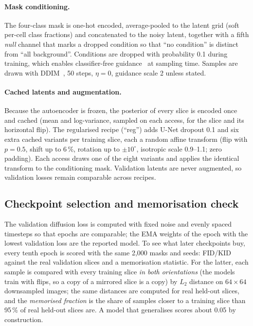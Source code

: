 \documentclass[10pt,a4paper]{article}
\begin{document}
\paragraph{Mask conditioning.} The four-class mask is one-hot encoded, average-pooled to the latent grid (soft per-cell class fractions) and concatenated to the noisy latent, together with a fifth \emph{null} channel that marks a dropped condition so that ``no condition'' is distinct from ``all background''. Conditions are dropped with probability 0.1 during training, which enables classifier-free guidance~\citep{ho2022cfg} at sampling time. Samples are drawn with DDIM~\citep{song2021ddim}, 50 steps, $\eta=0$, guidance scale 2 unless stated.

\paragraph{Cached latents and augmentation.} Because the autoencoder is frozen, the posterior of every slice is encoded once and cached (mean and log-variance, sampled on each access, for the slice and its horizontal flip). The regularised recipe (``reg'') adds U-Net dropout 0.1 and six extra cached variants per training slice, each a random affine transform (flip with $p=0.5$, shift up to 6\,\%, rotation up to $\pm10^\circ$, isotropic scale 0.9--1.1; zero padding). Each access draws one of the eight variants and applies the identical transform to the conditioning mask. Validation latents are never augmented, so validation losses remain comparable across recipes.

\subsection{Checkpoint selection and memorisation check}
\label{sec:method-mem}
The validation diffusion loss is computed with fixed noise and evenly spaced timesteps so that epochs are comparable; the EMA weights of the epoch with the lowest validation loss are the reported model. To see what later checkpoints buy, every tenth epoch is scored with the same 2,000 masks and seeds: FID/KID~\citep{heusel2017fid,binkowski2018kid} against the real validation slices and a memorisation statistic. For the latter, each sample is compared with every training slice \emph{in both orientations} (the models train with flips, so a copy of a mirrored slice is a copy) by $L_2$ distance on $64\times64$ downsampled images; the same distances are computed for real held-out slices, and the \emph{memorised fraction} is the share of samples closer to a training slice than 95\,\% of real held-out slices are. A model that generalises scores about 0.05 by construction.
\end{document}
